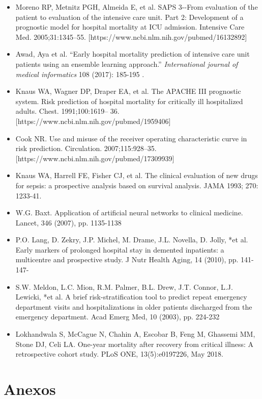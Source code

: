 \documentclass{report}
\begin{document}
\begin{itemize}
\item
  Moreno RP, Metnitz PGH, Almeida E, et al. SAPS 3-\/-From evaluation of
  the patient to evaluation of the intensive care unit. Part 2:
  Development of a prognostic model for hospital mortality at ICU
  admission. Intensive Care Med. 2005;31:1345--55.   {[}https://www.ncbi.nlm.nih.gov/pubmed/16132892{]}  
\item
  Awad, Aya et al. ``Early hospital mortality prediction of intensive
  care unit patients using an ensemble learning approach.''
  \emph{International journal of medical informatics} 108 (2017):
  185-195 .

\item
  Knaus WA, Wagner DP, Draper EA, et al. The APACHE III prognostic
  system. Risk prediction of hospital mortality for critically ill
  hospitalized adults. Chest. 1991;100:1619-- 36.
{[}https://www.ncbi.nlm.nih.gov/pubmed/1959406{]}  

\item
  Cook NR. Use and misuse of the receiver operating characteristic curve
  in risk prediction. Circulation. 2007;115:928--35.
{[}https://www.ncbi.nlm.nih.gov/pubmed/17309939{]}  
\item
  Knaus WA, Harrell FE, Fisher CJ, et al. The clinical evaluation of new
  drugs for sepsis: a prospective analysis based on survival analysis.
  JAMA 1993; 270: 1233-41.
\item
  W.G. Baxt. Application of artificial neural networks to clinical
  medicine. Lancet, 346 (2007), pp. 1135-1138
\item
  P.O. Lang, D. Zekry, J.P. Michel, M. Drame, J.L. Novella, D. Jolly,
  *et al. Early markers of prolonged hospital stay in demented
  inpatients: a multicentre and prospective study. J Nutr Health Aging,
  14 (2010), pp. 141-147-
\item
  S.W. Meldon, L.C. Mion, R.M. Palmer, B.L. Drew, J.T. Connor, L.J.
  Lewicki, *et al. A brief risk-stratification tool to predict repeat
  emergency department visits and hospitalizations in older patients
  discharged from the emergency department. Acad Emerg Med, 10 (2003),
  pp. 224-232
\item
  Lokhandwala S, McCague N, Chahin A, Escobar B, Feng M, Ghassemi MM,
  Stone DJ, Celi LA.  {One-year mortality after recovery from critical illness: A retrospective cohort study}.
  PLoS ONE, 13(5):e0197226, May 2018. 

\end{itemize}

\chapter*{Anexos}
\end{document}
